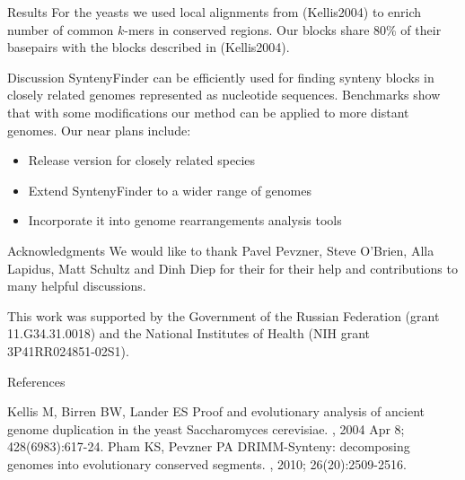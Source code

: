 \documentclass[final,hyperref={pdfpagelabels=false}]{beamer}
\begin{document}
\begin{frame}{}
\begin{columns}[t]
\begin{column}{0.32\linewidth}
\begin{block}{Results}
For the yeasts we used local alignments from (Kellis2004) to enrich number of common \(k\)-mers in conserved regions.
Our blocks share 80\% of their basepairs with the blocks described in (Kellis2004).
\end{block}

\begin{block}{Discussion} \justifying
SyntenyFinder can be efficiently used for finding synteny blocks in closely related genomes represented as nucleotide sequences. 
Benchmarks show that with some modifications our method can be applied to more distant genomes. Our near plans include:
\begin{itemize}
\item Release version for closely related species
\item Extend SyntenyFinder to a wider range of genomes
\item Incorporate it into genome rearrangements analysis tools
\end{itemize}
\end{block}

\begin{block}{Acknowledgments} \justifying
We would like to thank Pavel Pevzner, Steve O'Brien, Alla Lapidus, Matt Schultz and Dinh Diep for their 
for their help and contributions to many helpful discussions.

This work was supported by the Government of the Russian Federation (grant 11.G34.31.0018)
and the National Institutes of Health (NIH grant 3P41RR024851-02S1).
\end{block}

\begin{block}{References} \justifying
\begin{thebibliography}{10}
\small
\beamertemplatebookbibitems
{}
Kellis M, Birren BW, Lander ES
\newblock Proof and evolutionary analysis of ancient genome duplication in the yeast Saccharomyces cerevisiae.
, 2004 Apr 8; 428(6983):617-24.
\beamertemplatebookbibitems
{}
Pham KS, Pevzner PA
\newblock DRIMM-Synteny: decomposing genomes into evolutionary conserved segments.
, 2010; 26(20):2509-2516.
\end{thebibliography}
\end{block}

\end{column}

\end{columns}

\end{frame}
\end{document}
